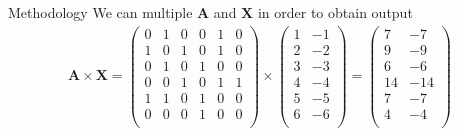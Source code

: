 \documentclass[notheorems, aspectratio=54]{beamer}
\begin{document}
	\begin{frame}{Methodology}
		We can multiple $\mathbf{A}$ and $\mathbf{X}$ in order to obtain output
		\begin{gather*}
			\mathbf{A} \times \mathbf{X} = \begin{pmatrix}
				0 & 1 & 0 & 0 & 1 & 0\\
				1 & 0 & 1 & 0 & 1 & 0\\
				0 & 1 & 0 & 1 & 0 & 0\\
				0 & 0 & 1 & 0 & 1 & 1\\
				1 & 1 & 0 & 1 & 0 & 0\\
				0 & 0 & 0 & 1 & 0 & 0\\
			\end{pmatrix} \times \begin{pmatrix}
			1 & -1\\
			2 & -2\\
			3 & -3\\
			4 & -4\\
			5 & -5\\
			6 & -6\\
		\end{pmatrix} = \begin{pmatrix}
		7 & -7\\
		9 & -9\\
		6 & -6\\
		14 & -14\\
		7 & -7\\
		4 & -4\\
		\end{pmatrix}
		\end{gather*}
	\end{frame}
\end{document}
